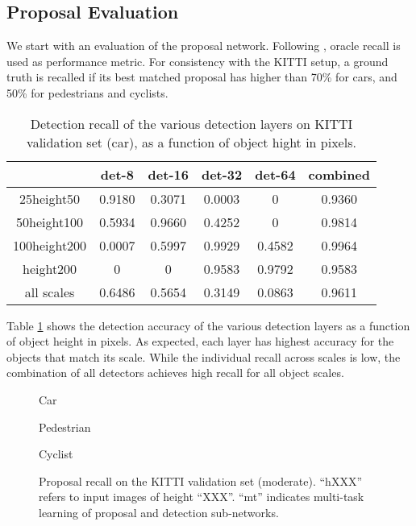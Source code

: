 \documentclass[runningheads]{llncs}
\begin{document}
\subsection{Proposal Evaluation}

We start with an evaluation of the proposal network. Following
\cite{DBLP:journals/pami/Hosang2015Pami}, oracle recall is used as
performance metric. For consistency with the KITTI setup, a ground truth
is recalled if its best matched proposal has  higher than 70\% for
cars, and 50\% for pedestrians and cyclists.

\begin{table}[t]
\centering \scriptsize \setlength{\tabcolsep}{3.0pt}
\vspace{0.1cm} \caption{Detection recall of the various detection layers on
  KITTI validation set (car), as a function of object hight in pixels.}
\label{tab:layer compraison}
\begin{tabular}
{c||c|c|c|c|c}
\multirow{2}{*}{}
&det-8 &det-16 &det-32 &det-64 &combined \\\hline\hline
25height50     &0.9180 &0.3071  &0.0003  &0      &0.9360\\
50height100    &0.5934 &0.9660  &0.4252  &0      &0.9814\\
100height200   &0.0007 &0.5997  &0.9929  &0.4582 &0.9964\\
height200         &0      &0       &0.9583  &0.9792 &0.9583\\\hline
all scales              &0.6486 &0.5654  &0.3149  &0.0863 &0.9611\\\hline
\end{tabular}
\end{table}

Table \ref{tab:layer compraison} shows the detection accuracy of the
various detection layers as a function of object height in pixels.
As expected, each layer has highest accuracy for the objects
that match its scale. While the individual recall across scales is low,
the combination of all detectors achieves high recall for all object
scales.


\begin{figure*}[!t]
\begin{minipage}[b]{.32\linewidth}
\centering
\centerline{}{Car}
\end{minipage}
\hfill
\begin{minipage}[b]{.32\linewidth}
\centering
\centerline{}{Pedestrian}
\end{minipage}
\hfill
\begin{minipage}[b]{.32\linewidth}
\centering
\centerline{}{Cyclist}
\end{minipage}
\caption{Proposal recall on the KITTI validation set (moderate).
``hXXX'' refers to input images of height ``XXX''. ``mt'' indicates
multi-task learning of proposal and detection sub-networks.}
\label{fig:mt sz comp}
\end{figure*}
\end{document}
